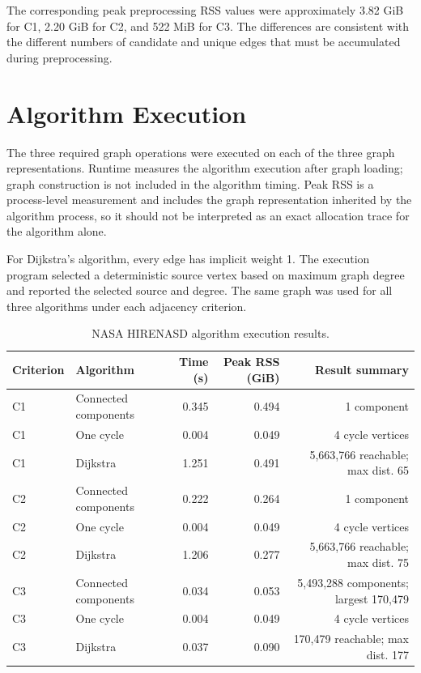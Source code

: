 \documentclass[11pt]{article}
\begin{document}
The corresponding peak preprocessing RSS values were approximately 3.82 GiB for C1, 2.20 GiB for C2, and 522 MiB for C3. The differences are consistent with the different numbers of candidate and unique edges that must be accumulated during preprocessing.

\section{Algorithm Execution}
The three required graph operations were executed on each of the three graph representations. Runtime measures the algorithm execution after graph loading; graph construction is not included in the algorithm timing. Peak RSS is a process-level measurement and includes the graph representation inherited by the algorithm process, so it should not be interpreted as an exact allocation trace for the algorithm alone.

For Dijkstra's algorithm, every edge has implicit weight 1. The execution program selected a deterministic source vertex based on maximum graph degree and reported the selected source and degree. The same graph was used for all three algorithms under each adjacency criterion.

\begin{table}[H]
\centering
\caption{NASA HIRENASD algorithm execution results.}
\label{tab:bonus-execution}
\small
\begin{tabular}{llrrr}
\toprule
Criterion & Algorithm & Time (s) & Peak RSS (GiB) & Result summary\\
\midrule
C1 & Connected components & 0.345 & 0.494 & 1 component\\
C1 & One cycle & 0.004 & 0.049 & 4 cycle vertices\\
C1 & Dijkstra & 1.251 & 0.491 & 5,663,766 reachable; max dist. 65\\
\midrule
C2 & Connected components & 0.222 & 0.264 & 1 component\\
C2 & One cycle & 0.004 & 0.049 & 4 cycle vertices\\
C2 & Dijkstra & 1.206 & 0.277 & 5,663,766 reachable; max dist. 75\\
\midrule
C3 & Connected components & 0.034 & 0.053 & 5,493,288 components; largest 170,479\\
C3 & One cycle & 0.004 & 0.049 & 4 cycle vertices\\
C3 & Dijkstra & 0.037 & 0.090 & 170,479 reachable; max dist. 177\\
\bottomrule
\end{tabular}
\end{table}
\end{document}
